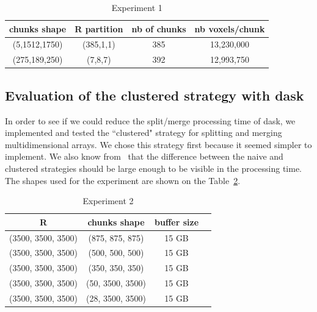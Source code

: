 \documentclass[conference]{IEEEtran}
\begin{document}
\begin{table}[ht]
 \centering
 \caption{Experiment 1}

  \begin{tabular}[t]{c c c c}
  \hline
  chunks shape & R partition & nb of chunks & nb voxels/chunk \\
    \hline\hline
    (5,1512,1750) & (385,1,1) & 385 & 13,230,000 \\
    \hline
    (275,189,250) & (7,8,7) & 392 & 12,993,750 \\
    \hline
  \end{tabular}

  \label{tab:exp1}
\end{table}

\subsection{Evaluation of the clustered strategy with dask}
In order to see if we could reduce the split/merge processing time of dask, we
implemented and tested the ``clustered" strategy for splitting and merging
multidimensional arrays. We chose this strategy first because it seemed simpler
to implement. We also know from~\cite{seqalgorithms} that the difference between
the naive and clustered strategies should be large enough to be visible in the
processing time. The shapes used for the experiment are shown on the
Table~\ref{tab:exp2}.

\begin{table}[ht]
 \centering
 \caption{Experiment 2}

  \begin{tabular}[t]{c c c c}
  \hline
    R & chunks shape & buffer size \\
    \hline\hline
    (3500, 3500, 3500) & (875, 875, 875) & 15 GB  \\
    \hline
    (3500, 3500, 3500) & (500, 500, 500) & 15 GB  \\
    \hline
    (3500, 3500, 3500) & (350, 350, 350) & 15 GB  \\
    \hline
    (3500, 3500, 3500) & (50, 3500, 3500) & 15 GB \\
    \hline
    (3500, 3500, 3500) & (28, 3500, 3500) & 15 GB \\
    \hline
  \end{tabular}

  \label{tab:exp2}
\end{table}
\end{document}
